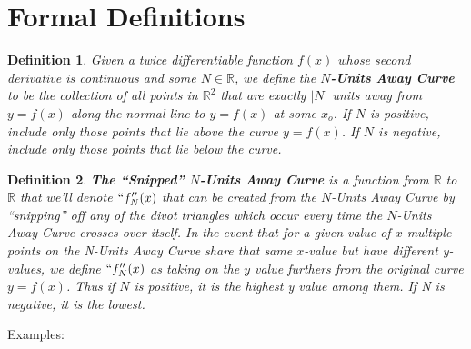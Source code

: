 \newtheorem{definition}{Definition}

\section{Formal Definitions}

\begin{definition}
    Given a twice differentiable function $f(x)$ whose second derivative is continuous and some $N \in \mathbb{R}$, we define the \textbf{$N$-Units Away Curve} to be the collection of all points in $\mathbb{R}^2$ that are exactly $|N|$ units away from $y = f(x)$ along the normal line to $y = f(x)$ at some $x_o$. If $N$ is positive, include only those points that lie above the curve $y = f(x)$. If $N$ is negative, include only those points that lie below the curve.
\end{definition}

\begin{definition}
    \textbf{The ``Snipped'' $N$-Units Away Curve} is a function from $\mathbb{R}$ to $\mathbb{R}$ that we’ll denote $``f_N''(x)$ that can be created from the $N$-Units Away Curve by ``snipping'' off any of the divot triangles which occur every time the $N$-Units Away Curve crosses over itself. In the event that for a given value of $x$ multiple points on the N-Units Away Curve share that same $x$-value but have different y-values, we define $``f_N''(x)$ as taking on the $y$ value furthers from the original curve $y = f(x)$. Thus if $N$ is positive, it is the highest y value among them. If N is negative, it is the lowest.
\end{definition}

Examples:

\renewcommand\w{0.45\linewidth}
\renewcommand\fw{\linewidth}

